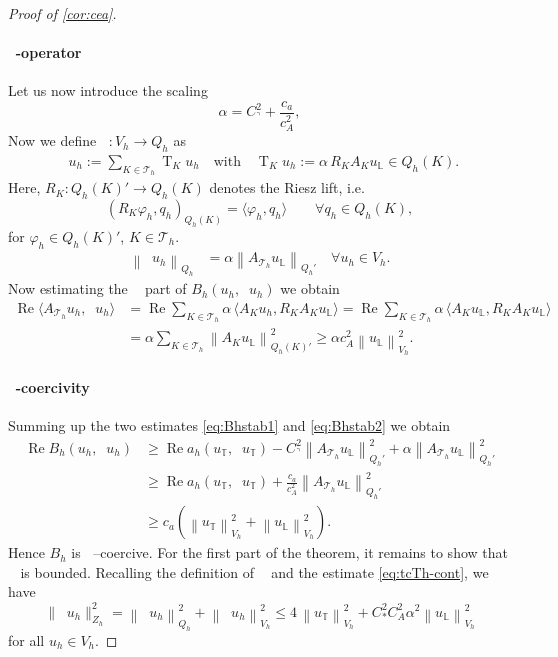\documentclass[11pt]{article}
\newenvironment{eqs} %
 { \begin{equation} \begin{aligned} } %
 { \end{aligned} \end{equation} \ignorespacesafterend } %
\theoremstyle{definition}
\theoremstyle{plain}
\newcommand{\CA}{C_A}
\newcommand{\ca}{c_a}
\newcommand{\cA}{c_A}
\newcommand{\CD}{C_*}
\newcommand{\CT}{C_\urcorner}
\newcommand{\dgnorm}[1]{\norm{#1}_{V_h}}
\newcommand{\Th}{{\calT_h}}
\newcommand{\AK}{{A_K}}
\newcommand{\QKh}{Q_h(K)}
\newcommand{\Qh}{Q_h}
\newcommand{\ATh}{A_{\Th}}
\newcommand{\Bh}{{B_h}}
\renewcommand{\Re}{\operatorname{Re}}
\DeclareMathOperator{\tc}{T}
\DeclareMathOperator{\tcq}{T_\IL}
\DeclareMathOperator{\tct}{T_\IT}
\DeclareMathOperator{\tcb}{T_{B}}
\DeclareMathOperator{\tch}{T_h}
\newcommand*{\norm}[1]{\left\|#1\right\|}
\newcommand{\IL}{\mathbb{L}}
\newcommand{\IT}{\mathbb{T}}
\newcommand{\calT}{\mathcal{T}}
\begin{document}
\begin{proof}[Proof of \cref{cor:cea}]
\paragraph{$\tcq$-operator} 
Let us now introduce the scaling
\[
\alpha=\CT^2+\frac{\ca}{\cA^2},
\]
Now we define $\tcq:V_h\rightarrow \Qh$ as
\begin{align}
    \tcq u_h := \sum_{K\in \Th} \tc_K u_h  \quad\text{with}\quad \tc_K u_h :=  \alpha\, R_K \AK u_\IL \in \QKh.
\end{align}
Here, $R_K:\QKh' \to \QKh$ denotes the Riesz lift, i.e.
\[
(R_K\varphi_h,q_h)_{\QKh}=\langle \varphi_h,q_h\rangle
\qquad\forall q_h\in\QKh,
\]
for $\varphi_h\in\QKh'$, $K\in\Th$.
\begin{align} \label{eq:tcTh-cont}
\norm{\tcq u_h}_{\Qh} & 
= \alpha \norm{\ATh u_\IL}_{\Qh'}
\quad \forall u_h \in V_h.
\end{align}
Now estimating the $\tcq$ part of $\Bh(u_h,\tcb u_h)$ we obtain 
\begin{eqs}\label{eq:Bhstab2}
\Re\langle \ATh u_h, \tcq u_h \rangle
&= \Re\sum_{K\in\Th}\alpha\,\langle \AK u_h, R_K \AK u_\IL\rangle
 = \Re\sum_{K\in\Th}\alpha\,\langle \AK u_\IL, R_K \AK u_\IL\rangle \\
&= \alpha \sum_{K\in\Th}\norm{\AK u_\IL}_{\QKh'}^2
\ge \alpha\cA^2\dgnorm{u_\IL}^2.
\end{eqs}

\paragraph{$\tcb$-coercivity} 
Summing up the two estimates \eqref{eq:Bhstab1} and \eqref{eq:Bhstab2} we obtain
\begin{eqs}\label{eq:Bhstab}
    \Re\Bh(u_h, \tcb u_h) 
    &\geq \Re a_h(u_\IT, \tch u_\IT) 
       - \CT^2 \norm{\ATh u_\IL}_{\Qh'}^2  
       + \alpha \norm{\ATh u_\IL}_{\Qh'}^2 \\
    &\geq  \Re a_h(u_\IT, \tch u_\IT) 
       + \frac{\ca}{\cA^2} \norm{\ATh u_\IL}_{\Qh'}^2 \\
    &\geq \ca(\dgnorm{u_\IT}^2 + \dgnorm{u_\IL}^2) .
\end{eqs}
Hence $\Bh$ is $\tcb$--coercive. 
For the first part of the theorem, it remains to show that $\tcb$ is bounded. Recalling the definition of $\tcb$ and the estimate \eqref{eq:tcTh-cont}, we have
\[
    \|\tcb u_h\|_{Z_h}^2
    = \norm{\tcq u_h}_{\Qh}^2 + \dgnorm{\tct u_h}^2
    \le 4\,\dgnorm{u_\IT}^2 + \CD^2\CA^2\alpha^2\dgnorm{u_\IL}^2
\]
for all $u_h\in V_h$.


\end{proof}
\end{document}

